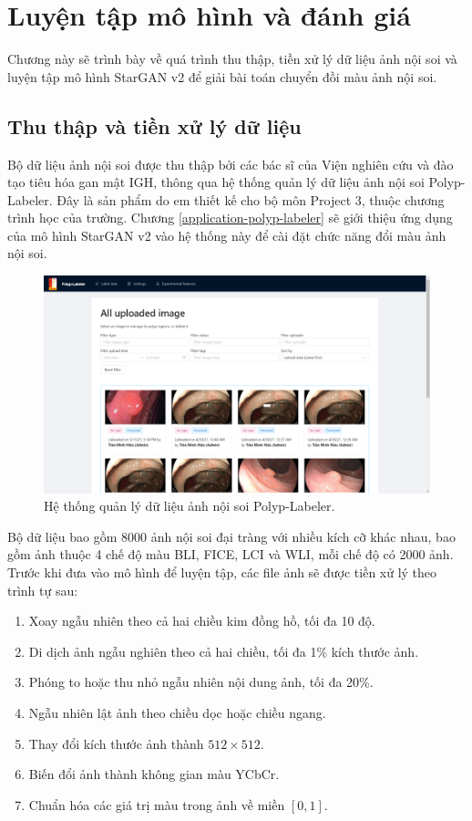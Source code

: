 \documentclass[12pt]{extreport}
\begin{document}
\chapter{Luyện tập mô hình và đánh giá}

Chương này sẽ trình bày về quá trình thu thập, tiền xử lý dữ liệu ảnh nội soi và luyện tập mô hình StarGAN v2 để giải bài toán chuyển đồi màu ảnh nội soi.

\section{Thu thập và tiền xử lý dữ liệu}

Bộ dữ liệu ảnh nội soi được thu thập bởi các bác sĩ của Viện nghiên cứu và đào tạo tiêu hóa gan mật IGH, thông qua hệ thống quản lý dữ liệu ảnh nội soi Polyp-Labeler. Đây là sản phẩm do em thiết kế cho bộ môn Project 3, thuộc chương trình học của trường. Chương \ref{application-polyp-labeler} sẽ giới thiệu ứng dụng của mô hình StarGAN v2 vào hệ thống này để cài đặt chức năng đổi màu ảnh nội soi.

\begin{figure}[H]
    \centering
    \includegraphics[width=0.7\linewidth]{figure34.png}
    \caption{Hệ thống quản lý dữ liệu ảnh nội soi Polyp-Labeler.}
\end{figure}

Bộ dữ liệu bao gồm 8000 ảnh nội soi đại tràng với nhiều kích cỡ khác nhau, bao gồm ảnh thuộc 4 chế độ màu BLI, FICE, LCI và WLI, mỗi chế độ có 2000 ảnh. Trước khi đưa vào mô hình để luyện tập, các file ảnh sẽ được tiền xử lý theo trình tự sau:
\begin{enumerate}
    \item Xoay ngẫu nhiên theo cả hai chiều kim đồng hồ, tối đa 10 độ.
    \item Di dịch ảnh ngẫu nghiên theo cả hai chiều, tối đa 1\% kích thước ảnh.
    \item Phóng to hoặc thu nhỏ ngẫu nhiên nội dung ảnh, tối đa 20\%.
    \item Ngẫu nhiên lật ảnh theo chiều dọc hoặc chiều ngang.
    \item Thay đổi kích thước ảnh thành $ 512 \times 512 $.
    \item Biến đổi ảnh thành không gian màu YCbCr.
    \item Chuẩn hóa các giá trị màu trong ảnh về miền $ [0, 1] $.
\end{enumerate}
\end{document}
